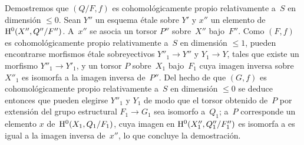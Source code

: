 Demostremos que $(Q/F,f)$ es cohomológicamente propio relativamente
a~$S$ en dimensión $\leqslant 0$. Sean $Y''$ un esquema étale sobre
$Y'$ y $x''$ un elemento de~$\mathrm H^0(X'',Q''/F'')$. A~$x''$ se asocia un
torsor $P''$ sobre~$X''$ bajo~$F''$. Como $(F,f)$ es
cohomológicamente propio relativamente a~$S$ en dimensión
$\leqslant 1$, pueden encontrarse morfismos étale sobreyectivos
$Y''_1 \to Y''$ y $Y_1 \to Y$, tales que existe un morfismo
$Y''_1 \to Y'_1$, y un torsor $P$ sobre~$X_1$ bajo~$F_1$ cuya imagen
inversa sobre~$X''_1$ es isomorfa a la imagen inversa de~$P''$. Del
hecho de que $(G,f)$ es cohomológicamente propio relativamente a~$S$
en dimensión $\leqslant 0$ se deduce entonces que pueden elegirse
$Y''_1$ y $Y_1$ de modo que el torsor obtenido de~$P$ por extensión
del grupo estructural $F_1 \to G_1$ sea isomorfo a~$Q_1$; a~$P$
corresponde un elemento $x$ de~$\mathrm H^0(X_1,Q_1/F_1)$, cuya imagen en
$\mathrm H^0(X''_1,Q''_1/F''_1)$
{es isomorfa a}
{es igual a}
la imagen inversa de~$x''$,
lo que concluye la demostración.
\endgroup

